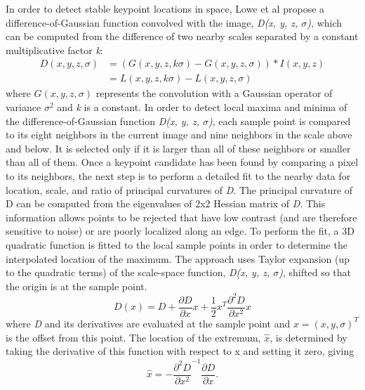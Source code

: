 \documentclass{llncs}
\begin{document}
In order to detect stable keypoint locations in space, Lowe et al \cite{Lowe:04} propose a difference-of-Gaussian function convolved with the image, \textit{D(x, y, z, $\sigma$)}, which can be computed from the difference of two nearby scales separated by a constant multiplicative factor \textit{k}:
\begin{align}
    D(x,y,z,\sigma) &= (G(x,y,z,k\sigma) - G(x,y,z,\sigma)) * I(x,y,z) \\
                    &= L(x, y, z, k\sigma) - L(x, y, z, \sigma) \nonumber
\end{align}
where $G(x,y,z,\sigma)$ represents the convolution with a Gaussian operator of variance $\sigma^2$ and \textit{k} is a constant. In order to detect local maxima and minima of the difference-of-Gaussian function \textit{D(x, y, z, $\sigma$)}, each sample point is compared to its eight neighbors in the current image and nine neighbors in the scale above and below. It is selected only if it is larger than all of these neighbors or smaller than all of them. Once a keypoint candidate has been found by comparing a pixel to its neighbors, the next step is to perform a detailed fit to the nearby data for location, scale, and ratio of principal curvatures of \emph{D}. The principal curvature of D can be computed from the eigenvalues of 2x2 Hessian matrix of \emph{D}. This information allows points to be rejected that have low contrast (and are therefore sensitive to noise) or are poorly localized along an edge. To perform the fit, a 3D quadratic function is fitted to the local sample points in order to determine the interpolated location of the maximum. The approach uses Taylor expansion (up to the quadratic terms) of the scale-space function, \textit{D(x, y, z, $\sigma$)}, shifted so that the origin is at the sample point.
\begin{equation}
D(x) = D + \frac{\partial D}{\partial x} x + \frac{1}{2}x^T \frac{\partial^2 D}{\partial x^2} x
\end{equation}
where \emph{D} and its derivatives are evaluated at the sample point and $x = (x,y,\sigma)^T$ is the offset from this point. The location of the extremum, $\hat{x}$, is determined by taking the derivative of this function with respect to x and setting it zero, giving
\begin{equation}
    \hat{x} = -{\frac{\partial^2 D}{\partial x^2}}^{-1} \frac{\partial D}{\partial x}.
\end{equation}
\end{document}
